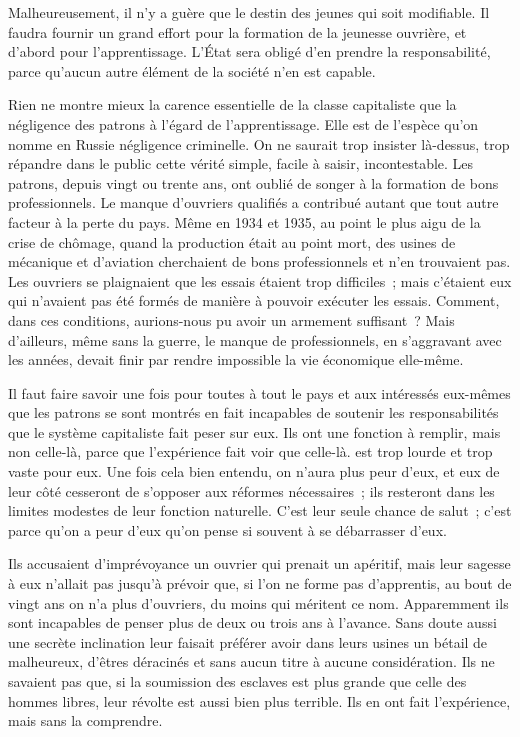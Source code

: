 \documentclass[french,twoside]{book} %
\begin{document}
Malheureusement, il n'y a guère que le destin des jeunes qui soit modifiable. Il faudra fournir un grand effort pour la formation de la jeunesse ouvrière, et d'abord pour l'apprentissage. L'État sera obligé d'en prendre la responsabilité, parce qu'aucun autre élément de la société n'en est capable.\par
Rien ne montre mieux la carence essentielle de la classe capitaliste que la négligence des patrons à l'égard de l'apprentissage. Elle est de l'espèce qu'on nomme en Russie négligence criminelle. On ne saurait trop insister là-dessus, trop répandre dans le public cette vérité simple, facile à saisir, incontestable. Les patrons, depuis vingt ou trente ans, ont oublié de songer à la formation de bons professionnels. Le manque d'ouvriers qualifiés a contribué autant que tout autre facteur à la perte du pays. Même en 1934 et 1935, au point le plus aigu de la crise de chômage, quand la production était au point mort, des usines de mécanique et d'aviation cherchaient de bons professionnels et n'en trouvaient pas. Les ouvriers se plaignaient que les essais étaient trop difficiles ; mais c'étaient eux qui n'avaient pas été formés de manière à pouvoir exécuter les essais. Comment, dans ces conditions, aurions-nous pu avoir un armement suffisant ? Mais d'ailleurs, même sans la guerre, le manque de professionnels, en s'aggravant avec les années, devait finir par rendre impossible la vie économique elle-même.\par
Il faut faire savoir une fois pour toutes à tout le pays et aux intéressés eux-mêmes que les patrons se sont montrés en fait incapables de soutenir les responsabilités que le système capitaliste fait peser sur eux. Ils ont une fonction à remplir, mais non celle-là, parce que l'expérience fait voir que celle-là. est trop lourde et trop vaste pour eux. Une fois cela bien entendu, on n'aura plus peur d'eux, et eux de leur côté cesseront de s'opposer aux réformes nécessaires ; ils resteront dans les limites modestes de leur fonction naturelle. C'est leur seule chance de salut ; c'est parce qu'on a peur d'eux qu'on pense si souvent à se débarrasser d'eux.\par
Ils accusaient d'imprévoyance un ouvrier qui prenait un apéritif, mais leur sagesse à eux n'allait pas jusqu'à prévoir que, si l'on ne forme pas d'apprentis, au bout de vingt ans on n'a plus d'ouvriers, du moins qui méritent ce nom. Apparemment ils sont incapables de penser plus de deux ou trois ans à l'avance. Sans doute aussi une secrète inclination leur faisait préférer avoir dans leurs usines un bétail de malheureux, d'êtres déracinés et sans aucun titre à aucune considération. Ils ne savaient pas que, si la soumission des esclaves est plus grande que celle des hommes libres, leur révolte est aussi bien plus terrible. Ils en ont fait l'expérience, mais sans la comprendre.\par
\end{document}
